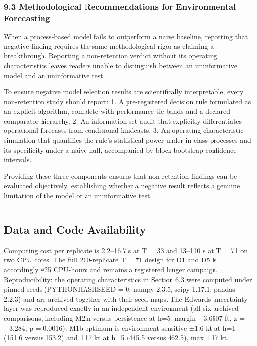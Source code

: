 \documentclass[11pt]{article}
\begin{document}
\subsubsection{9.3 Methodological Recommendations for Environmental
Forecasting}\label{methodological-recommendations-for-environmental-forecasting}

When a process-based model fails to outperform a naive baseline,
reporting that negative finding requires the same methodological rigor
as claiming a breakthrough. Reporting a non-retention verdict without
its operating characteristics leaves readers unable to distinguish
between an uninformative model and an uninformative test.

To ensure negative model selection results are scientifically
interpretable, every non-retention study should report: 1. A
pre-registered decision rule formulated as an explicit algorithm,
complete with performance tie bands and a declared comparator hierarchy.
2. An information-set audit that explicitly differentiates operational
forecasts from conditional hindcasts. 3. An operating-characteristic
simulation that quantifies the rule's statistical power under in-class
processes and its specificity under a naive null, accompanied by
block-bootstrap confidence intervals.

Providing these three components ensures that non-retention findings can
be evaluated objectively, establishing whether a negative result
reflects a genuine limitation of the model or an uninformative test.

\begin{center}\rule{0.5\linewidth}{0.5pt}\end{center}

\subsection{Data and Code
Availability}\label{data-and-code-availability}

Computing cost per replicate is 2.2--16.7 s at T = 33 and 13--110 s at T
= 71 on two CPU cores. The full 200-replicate T = 71 design for D1 and
D5 is accordingly ≈25 CPU-hours and remains a registered longer
campaign. Reproducibility: the operating characteristics in Section 6.3
were computed under pinned seeds (PYTHONHASHSEED = 0; numpy 2.3.5, scipy
1.17.1, pandas 2.2.3) and are archived together with their seed maps.
The Edwards uncertainty layer was reproduced exactly in an independent
environment (all six archived comparisons, including M2m versus
persistence at h=5: margin −3.6607 ft, z = −3.284, p = 0.0016). M1b
optimum is environment-sensitive ±1.6 kt at h=1 (151.6 versus 153.2) and
±17 kt at h=5 (445.5 versus 462.5), max ±17 kt.
\end{document}
